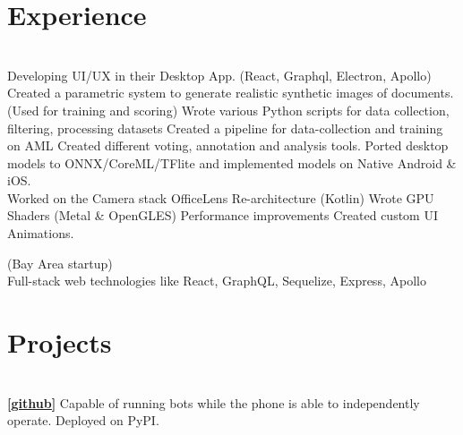\documentclass[]{deedy-resume-openfont}
\begin{document}
\begin{minipage}[t]{0.66\textwidth} 


\section{Experience}
\\
Developing UI/UX in their Desktop App. (React, Graphql, Electron, Apollo)\\
\textbullet Created a parametric system to generate realistic synthetic images of documents. (Used for training and scoring)
\textbullet Wrote various Python scripts for data collection, filtering, processing datasets \textbullet Created a pipeline for data-collection and training on AML \textbullet Created different voting, annotation and analysis tools.  \textbullet Ported desktop models to ONNX/CoreML/TFlite and implemented models on Native Android \& iOS. \\
\textbullet  Worked on the Camera stack \textbullet  OfficeLens Re-architecture (Kotlin) \textbullet  Wrote GPU Shaders (Metal \& OpenGLES) \textbullet  Performance improvements
\textbullet Created custom UI Animations.
\sectionsep

 (Bay Area startup) \\
Full-stack web technologies like React, GraphQL, Sequelize, Express, Apollo


\section{Projects}
\\
\textbf{\href{https://github.com/mukulhase/WhatsAPI}{[\underline{github}]}} Capable of running bots while the phone is able to independently operate. Deployed on PyPI.
\sectionsep


\end{minipage}
\end{document}
